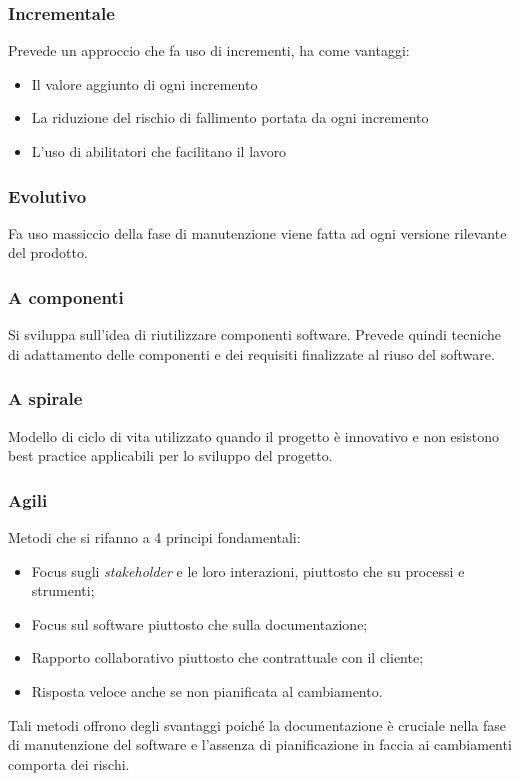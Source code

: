 		\subsubsection{Incrementale}
			Prevede un approccio che fa uso di incrementi, ha come vantaggi:
			\begin{itemize}  
			\item Il valore aggiunto di ogni incremento 
			\item La riduzione del rischio di fallimento portata da ogni incremento
			\item L'uso di abilitatori che facilitano il lavoro 
			\end{itemize}			
			
		\subsubsection{Evolutivo}
			Fa uso massiccio della fase di manutenzione viene fatta ad ogni versione rilevante del prodotto.
		
		\subsubsection{A componenti}
			Si sviluppa sull'idea di riutilizzare componenti software. Prevede quindi tecniche di adattamento delle componenti e dei requisiti finalizzate al riuso del software.
		
		\subsubsection{A spirale}	
				Modello di ciclo di vita utilizzato quando il progetto è innovativo e non esistono best practice applicabili per lo sviluppo del progetto.
		
		\subsubsection{Agili}
		Metodi che si rifanno a 4 principi fondamentali:
			\begin{itemize}  
			\item Focus sugli \emph{stakeholder} e le loro interazioni, piuttosto che su processi e strumenti;
			\item Focus sul software piuttosto che sulla documentazione;
			\item Rapporto collaborativo piuttosto che contrattuale con il cliente;
			\item Risposta veloce anche se non pianificata al cambiamento. 
			\end{itemize}				
		Tali metodi offrono degli svantaggi poiché la documentazione è cruciale nella fase di manutenzione del software e l'assenza di pianificazione in faccia ai cambiamenti comporta dei rischi.
		

